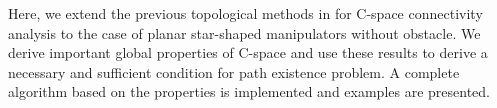 \documentclass[twocolumn]{IEEEtran}
\begin{document}

Here, we extend the previous topological methods in
\cite{TM02,LTrss05} for C-space connectivity analysis to the case of
planar star-shaped manipulators without obstacle. We derive
important global properties of C-space and use these results to
derive a necessary and sufficient condition for path existence
problem.  A complete algorithm based on the properties is
implemented and examples are presented.
\end{document}
